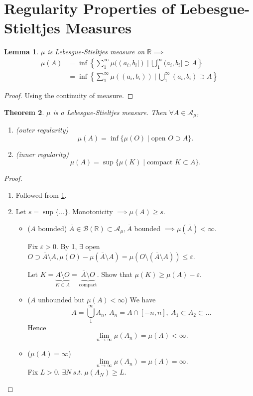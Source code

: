 \documentclass{report}
\newcommand{\R}{\mathbb{R}}
\newcommand{\st}{\ s.t.\ }
\newtheorem{theorem}{Theorem}[chapter]
\newtheorem{lemma}[theorem]{Lemma}
\theoremstyle{definition}
\theoremstyle{remark}
\begin{document}
\section{Regularity Properties of Lebesgue-Stieltjes Measures}
\begin{lemma}\label{le:LSreal}
$\mu$ is Lebesgue-Stieltjes measure on $\R \implies$ 
\begin{align*}
    \mu(A) & = \inf\left\{\sum_1^\infty\mu((a_i, b_i])\ \biggr\vert\ \bigcup_1^\infty(a_i, b_i] \supset A\right\} \\
           & =\inf\left\{\sum_1^\infty\mu((a_i, b_i))\ \biggr\vert\ \bigcup_1^\infty(a_i, b_i) \supset A\right\}
\end{align*}
\end{lemma}
\begin{proof}
	Using the continuity of measure.
\end{proof}

\begin{theorem}
	$\mu$ is a Lebesgue-Stieltjes measure. Then $\forall A \in \mathcal{A}_\mu$,
	\begin{enumerate}
		\item (outer regularity) \[
			\mu(A) = \inf\{\mu(O) \mid \text{open } O \supset A\}.	
		\]
		\item (inner regularity) \[
			\mu(A) = \sup\{\mu(K) \mid \text{compact } K \subset A\}.
		\]
	\end{enumerate}
\end{theorem}
\begin{proof}
	\begin{enumerate}
		\item Followed from \ref{le:LSreal}.
		\item Let $s = \sup\{\ldots\}$. 
		Monotonicity $\implies \mu(A) \geq s$.
		\begin{itemize}
			\item ($A$ bounded)
			$\overline{A} \in \mathcal{B}(\R) \subset \mathcal{A}_\mu, \overline{A}$ bounded $\implies \mu(\overline{A}) < \infty$.

			Fix $\varepsilon > 0$. By 1, $\exists$ open $O \supset \overline{A} \setminus A, \mu(O) - \mu(\overline{A} \setminus A) = \mu(O \setminus (\overline{A} \setminus A))\leq \varepsilon$.

			Let $K = \underbrace{A \setminus O}_{K \subset A} = \underbrace{\overline{A} \setminus O}_{\text{compact}}$. Show that $\mu(K) \geq \mu(A) - \varepsilon$.

			\item ($A$ unbounded but $\mu(A) < \infty$)
			We have
			\[
				A = \bigcup_1^\infty A_n,\ A_n = A \cap [-n, n],\ A_1 \subset A_2 \subset \ldots	
			\]
			Hence \[
				\lim_{n \to \infty} \mu(A_n) = \mu(A) < \infty.
			\]

			\item ($\mu(A) = \infty$)
			\[
				\lim_{n \to \infty} \mu(A_n) = \mu(A) = \infty.
			\]
			Fix $L > 0$. $\exists N \st \mu(A_N) \geq L$. \qedhere
		\end{itemize}
	\end{enumerate}
\end{proof}
\end{document}
